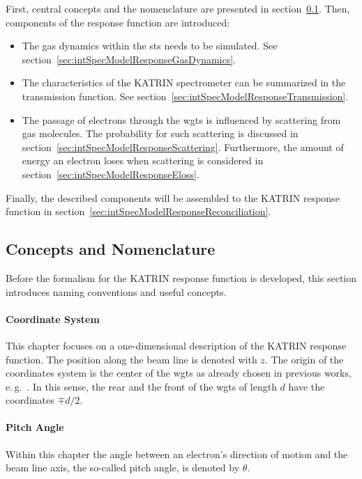 First, central concepts and the nomenclature are presented in section~\ref{sec:intSpecModelResponseConcepts}. Then, components of the response function are introduced: 
\begin{itemize}
	\item The gas dynamics within the \gls{sts} needs to be simulated. See section~\ref{sec:intSpecModelResponseGasDynamics}.
	\item The characteristics of the KATRIN spectrometer can be summarized in the transmission function. See section~\ref{sec:intSpecModelResponseTransmission}.
	\item The passage of electrons through the \gls{wgts} is influenced by scattering from gas molecules. The probability for such scattering is discussed in section~\ref{sec:intSpecModelResponseScattering}. Furthermore, the amount of energy an electron loses when scattering is considered in section~\ref{sec:intSpecModelResponseEloss}.
\end{itemize}
Finally, the described components will be assembled to the KATRIN response function in section~\ref{sec:intSpecModelResponseReconciliation}.
\subsection{Concepts and Nomenclature}
\label{sec:intSpecModelResponseConcepts}
Before the formalism for the KATRIN response function is developed, this section introduces naming conventions and useful concepts. 

\paragraph{Coordinate System}
This chapter focuses on a one-dimensional description of the KATRIN response function. The position along the beam line is denoted with $z$. The origin of the coordinates system is the center of the \gls{wgts} as already chosen in previous works, e.\,g.~\cite{Groh2015,Kleesiek2014}. In this sense, the rear and the front of the \gls{wgts} of length $d$ have the coordinates $\mp d/2$.

\paragraph{Pitch Angle}
Within this chapter the angle between an electron's direction of motion and the beam line axis, the so-called pitch angle, is denoted by $\theta$.

